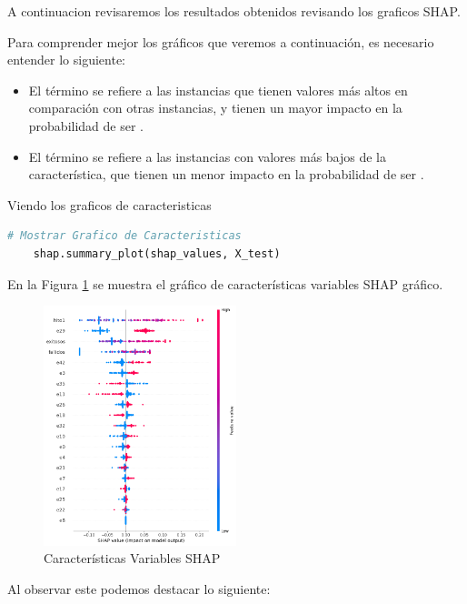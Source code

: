 A continuacion revisaremos los resultados obtenidos revisando los graficos SHAP.

Para comprender mejor los gráficos que veremos a continuación, es necesario entender lo siguiente:

\begin{itemize}
    \item El término  se refiere a las instancias que tienen valores más altos en comparación con otras instancias, y tienen un mayor impacto en la probabilidad de ser .
    \item El término  se refiere a las instancias con valores más bajos de la característica, que tienen un menor impacto en la probabilidad de ser .
\end{itemize}

Viendo los graficos de caracteristicas

\begin{lstlisting}[language=Python, caption=Realizar Stratified K-Fold Cross-Validation en los datos de entrenamiento, label=lst:skfold_train]
    # Mostrar Grafico de Caracteristicas
    shap.summary_plot(shap_values, X_test)
\end{lstlisting}


En la Figura \ref{fig:caract_var_shap} se muestra el gráfico de características variables SHAP gráfico.

\begin{figure}[H]
    \centering
    \includegraphics[width=0.5\textwidth]{img/shap_rf/shapForcePlot2.png}
    \caption{Características Variables SHAP}
    \label{fig:caract_var_shap}
\end{figure}

Al observar este podemos destacar lo siguiente:

